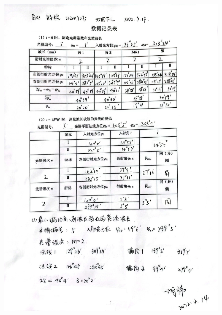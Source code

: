 \documentclass[UTF8]{ctexart}
\begin{document}
\begin{figure}[H]
  \centering
  \includegraphics[scale=0.18]{数据.jpg}
\end{figure}
\end{document}
